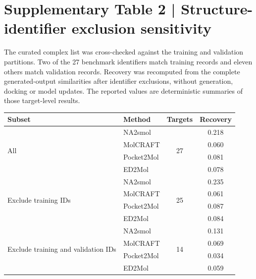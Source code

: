 \section*{Supplementary Table 2 | Structure-identifier exclusion sensitivity}
The curated complex list was cross-checked against the training and validation partitions. Two of the 27 benchmark identifiers match training records and eleven others match validation records. Recovery was recomputed from the complete generated-output similarities after identifier exclusions, without generation, docking or model updates. The reported values are deterministic summaries of those target-level results.
\begin{center}\footnotesize
\begin{tabular}{@{}llcc@{}}
\toprule
\textbf{Subset} & \textbf{Method} & \textbf{Targets} & \textbf{Recovery} \\
\midrule
\multirow{4}{*}{All}
  & NA2smol    & \multirow{4}{*}{27} & 0.218 \\
  & MolCRAFT   &                     & 0.060 \\
  & Pocket2Mol &                     & 0.081 \\
  & ED2Mol     &                     & 0.078 \\
\midrule
\multirow{4}{*}{Exclude training IDs}
  & NA2smol    & \multirow{4}{*}{25} & 0.235 \\
  & MolCRAFT   &                     & 0.061 \\
  & Pocket2Mol &                     & 0.087 \\
  & ED2Mol     &                     & 0.084 \\
\midrule
\multirow{4}{*}{Exclude training and validation IDs}
  & NA2smol    & \multirow{4}{*}{14} & 0.131 \\
  & MolCRAFT   &                     & 0.069 \\
  & Pocket2Mol &                     & 0.034 \\
  & ED2Mol     &                     & 0.059 \\
\bottomrule
\end{tabular}\end{center}

